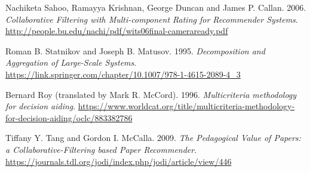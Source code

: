 \documentclass[sigconf,authordraft]{acmart}
\begin{document}
\begin{enumerate}[label={[\arabic*]}]
    \item
    Nachiketa Sahoo, Ramayya Krishnan, George Duncan and James P. Callan. 2006. \textit{Collaborative Filtering with Multi-component Rating for Recommender Systems}. \url{http://people.bu.edu/nachi/pdf/wits06final-cameraready.pdf}
    
    \item
    Roman B. Statnikov and Joseph B. Matusov. 1995. \textit{Decomposition and Aggregation of Large-Scale Systems}. \url{https://link.springer.com/chapter/10.1007/978-1-4615-2089-4_3}
    
    \item
    Bernard Roy (translated by Mark R. McCord). 1996. \textit{Multicriteria methodology for decision aiding}. \url{https://www.worldcat.org/title/multicriteria-methodology-for-decision-aiding/oclc/883382786}
    
    \item
    Tiffany Y. Tang and Gordon I. McCalla. 2009. \textit{The Pedagogical Value of Papers: a Collaborative-Filtering based Paper Recommender}. \url{https://journals.tdl.org/jodi/index.php/jodi/article/view/446}
\end{enumerate}
\end{document}

